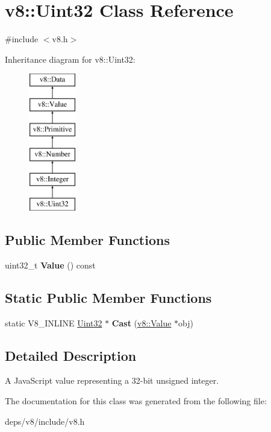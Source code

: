 \hypertarget{classv8_1_1_uint32}{}\section{v8\+:\+:Uint32 Class Reference}
\label{classv8_1_1_uint32}


{\ttfamily \#include $<$v8.\+h$>$}

Inheritance diagram for v8\+:\+:Uint32\+:\begin{figure}[H]
\begin{center}
\leavevmode
\includegraphics[height=6.000000cm]{classv8_1_1_uint32}
\end{center}
\end{figure}
\subsection*{Public Member Functions}
\begin{DoxyCompactItemize}
\item 
\hypertarget{classv8_1_1_uint32_ad59790c380f4de98c4cc479140812fe0}{}uint32\+\_\+t {\bfseries Value} () const \label{classv8_1_1_uint32_ad59790c380f4de98c4cc479140812fe0}

\end{DoxyCompactItemize}
\subsection*{Static Public Member Functions}
\begin{DoxyCompactItemize}
\item 
\hypertarget{classv8_1_1_uint32_a41a1785c19221868e338b93faa383b62}{}static V8\+\_\+\+I\+N\+L\+I\+N\+E \hyperlink{classv8_1_1_uint32}{Uint32} $\ast$ {\bfseries Cast} (\hyperlink{classv8_1_1_value}{v8\+::\+Value} $\ast$obj)\label{classv8_1_1_uint32_a41a1785c19221868e338b93faa383b62}

\end{DoxyCompactItemize}


\subsection{Detailed Description}
A Java\+Script value representing a 32-\/bit unsigned integer. 

The documentation for this class was generated from the following file\+:\begin{DoxyCompactItemize}
\item 
deps/v8/include/v8.\+h\end{DoxyCompactItemize}
